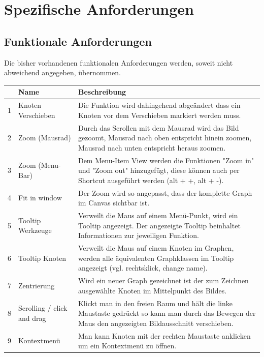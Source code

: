 \documentclass[11pt,a4paper]{article}
\begin{document}
\section{Spezifische Anforderungen} %
	\subsection{Funktionale Anforderungen} %
	
	Die bisher vorhandenen funktionalen Anforderungen werden, soweit nicht abweichend angegeben, übernommen.

\vspace*{1cm}
\hspace*{-0.8cm}
\begin{tabular}{|c|p{5cm}|p{10cm}|}
\hline 
 & Name & Beschreibung \\ 
\hline 
1 & Knoten Verschieben & Die Funktion wird dahingehend abgeändert dass ein Knoten vor dem Verschieben markiert werden muss. \\ 
\hline 
2 & Zoom (Mausrad) & Durch das Scrollen mit dem Mausrad wird das Bild gezoomt, Mausrad nach oben entspricht hinein zoomen, Mausrad nach unten entspricht heraus zoomen. \\ 
\hline 
3 & Zoom (Menu-Bar) & Dem Menu-Item View werden die Funktionen "Zoom in" und "Zoom out" hinzugefügt, diese können auch per Shortcut ausgeführt werden (alt + +, alt + -). \\ 
\hline 
4 & Fit in window & Der Zoom wird so angepasst, dass der komplette Graph im Canvas sichtbar ist. \\
\hline
5 & Tooltip Werkzeuge& Verweilt die Maus auf einem Menü-Punkt, wird ein Tooltip angezeigt. Der angezeigte Tooltip beinhaltet Informationen zur jeweiligen Funktion. \\ 
\hline
6 & Tooltip Knoten& Verweilt die Maus auf einem Knoten im Graphen, werden alle äquivalenten Graphklassen im Tooltip angezeigt (vgl. rechtsklick, change name). \\ 
\hline 
7 & Zentrierung & Wird ein neuer Graph gezeichnet ist der zum Zeichnen ausgewählte Knoten im Mittelpunkt des Bildes. \\ 
\hline 
8 & Scrolling / click and drag & Klickt man in den freien Raum und hält die linke Maustaste gedrückt so kann man durch das Bewegen der Maus den angezeigten Bildausschnitt verschieben.\\ 
\hline 
9 & Kontextmenü & Man kann Knoten mit der rechten Maustaste anklicken um ein Kontextmenü zu öffnen. \\

\end{tabular}
\end{document}
